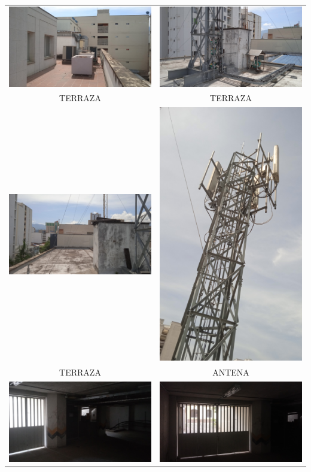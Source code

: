 \documentclass[12pt,a4paper,twoside]{article}
\begin{document}
{\begin{tabular}{ c c }
	
\includegraphics[width = 7 cm]{Imagenes/35} & \includegraphics[width = 7 cm]{Imagenes/36} \\
	TERRAZA & TERRAZA\\
	\includegraphics[width = 7 cm]{Imagenes/37} & \includegraphics[width = 3 cm]{Imagenes/38} \\
	TERRAZA & ANTENA\\
		\includegraphics[width = 7 cm]{Imagenes/39} & \includegraphics[width = 7 cm]{Imagenes/40} \\

\end{tabular}}
\end{document}
